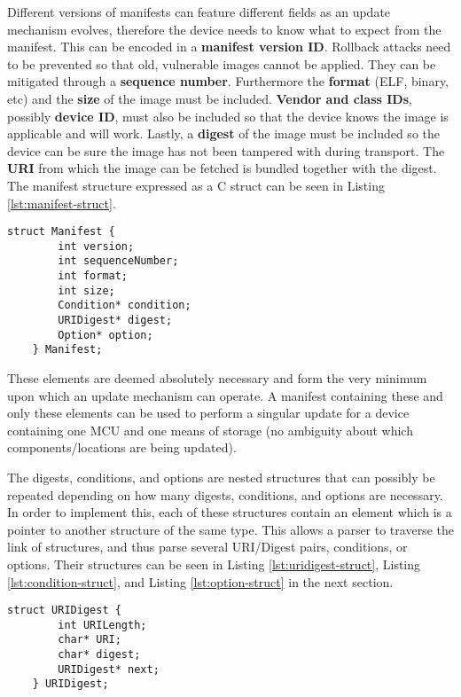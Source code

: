 \documentclass[0-thesis.tex]{subfiles}
\begin{document}
Different versions of manifests can feature different fields as an update mechanism
evolves, therefore the device needs to know what to expect from the manifest. This can be
encoded in a \textbf{manifest version ID}. Rollback attacks need to be prevented so that
old, vulnerable images cannot be applied. They can be mitigated through a \textbf{sequence
number}. Furthermore the \textbf{format} (ELF, binary, etc) and the \textbf{size} of the
image must be included. \textbf{Vendor and class IDs}, possibly \textbf{device ID}, must
also be included so that the device knows the image is applicable and will work. Lastly, a
\textbf{digest} of the image must be included so the device can be sure the image has not
been tampered with during transport. The \textbf{URI} from which the image can be fetched
is bundled together with the digest. The manifest structure expressed as a C struct can be
seen in Listing \ref{lst:manifest-struct}.

\begin{lstlisting}[caption={The mandatory manifest format.}, 
                    label={lst:manifest-struct}]
    struct Manifest {
        int version;
        int sequenceNumber;
        int format;
        int size;
        Condition* condition;
        URIDigest* digest;
        Option* option;
    } Manifest;
\end{lstlisting}

These elements are deemed absolutely necessary and form the very minimum upon which an
update mechanism can operate. A manifest containing these and only these elements can be
used to perform a singular update for a device containing one MCU and one means of storage
(no ambiguity about which components/locations are being updated).

The digests, conditions, and options are nested structures that can possibly be repeated
depending on how many digests, conditions, and options are necessary. In order to
implement this, each of these structures contain an element which is a pointer to another
structure of the same type. This allows a parser to traverse the link of structures, and
thus parse several URI/Digest pairs, conditions, or options. Their structures can be seen
in Listing \ref{lst:uridigest-struct}, Listing \ref{lst:condition-struct}, and Listing
\ref{lst:option-struct} in the next section.

\begin{lstlisting}[caption={The format of URI/digest pairs.}, 
                    label={lst:uridigest-struct}]
    struct URIDigest {
        int URILength;
        char* URI;
        char* digest;
        URIDigest* next;
    } URIDigest;
\end{lstlisting}
\end{document}
